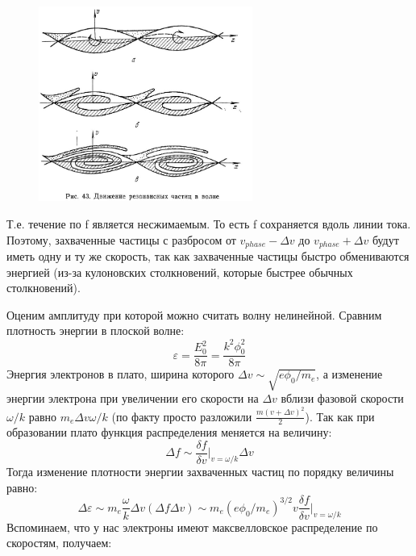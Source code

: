 \documentclass[10pt, a4paper]{article}
\begin{document}
\begin{figure}[h!]
	\begin{center}
		\includegraphics[width=70mm]{zatuh_landau_nonlinear_3.JPG}
	\end{center}
\end{figure}

Т.е. течение по f является несжимаемым. То есть f сохраняется вдоль линии тока. Поэтому, захваченные частицы с разбросом от $v_{phase} - \Delta v$ до  $v_{phase}+\Delta v$ будут иметь одну и ту же скорость, так как захваченные частицы быстро обмениваются энергией (из-за кулоновских столкновений, которые быстрее обычных столкновений).

Оценим амплитуду при которой можно считать волну нелинейной. Сравним плотность энергии в плоской волне:
\begin{equation}
	\varepsilon = \frac{E^{2}_0}{8 \pi} = \frac {k^2 \phi^{2}_0}{8 \pi}
\end{equation}
Энергия электронов в плато, ширина которого $\Delta v \sim \sqrt{e \phi_0 /m_e}$, а изменение энергии электрона при увеличении его скорости на $\Delta v$ вблизи фазовой скорости $\omega/k$ равно $m_e \Delta v \omega /k$ (по факту просто разложили $\frac{m(v+\Delta v)^2}{2}$).
Так как при образовании плато функция распределения меняется на величину:
\begin{equation}
	\Delta f \sim \frac{\delta f}{\delta v}|_{v=\omega/k} \Delta v
\end{equation}
Тогда изменение плотности энергии захваченных частиц по порядку величины равно:
\begin{equation}
	\Delta \varepsilon \sim m_e \frac{\omega}{k} \Delta v (\Delta f \Delta v ) \sim m_e (e \phi_0 /m_e)^{3/2} v \frac{\delta f}{\delta v}|_{v=\omega/k} 
\end{equation}
Вспоминаем, что у нас электроны имеют максвелловское распределение по скоростям, получаем:
\end{document}
